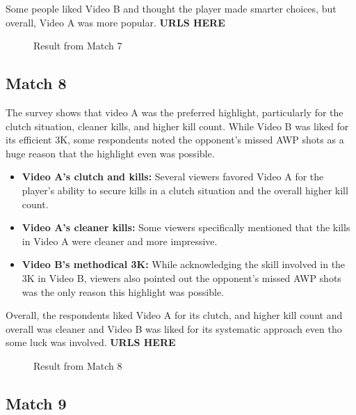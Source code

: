 Some people liked Video B and thought the player made smarter choices, but overall, Video A was more popular.
\textbf{URLS HERE}
\begin{figure}
\centering
{}
\caption{Result from Match 7}
\label{fig:match7}
\end{figure}
\subsection{Match 8}
The survey shows that video A was the preferred highlight, particularly for the clutch situation, cleaner kills, and higher kill count. While Video B was liked for its efficient 3K, some respondents noted the opponent's missed AWP shots as a huge reason that the highlight even was possible.

\begin{itemize}
\item \textbf{Video A's clutch and kills:} Several viewers favored Video A for the player's ability to secure kills in a clutch situation and the overall higher kill count.
\item \textbf{Video A's cleaner kills:} Some viewers specifically mentioned that the kills in Video A were cleaner and more impressive.
\item \textbf{Video B's methodical 3K:} While acknowledging the skill involved in the 3K in Video B, viewers also pointed out the opponent's missed AWP shots was the only reason this highlight was possible.
\end{itemize}

Overall, the respondents liked Video A for its clutch, and higher kill count and overall was cleaner and Video B was liked for its systematic approach even tho some luck was involved.
\textbf{URLS HERE}
\begin{figure}
\centering
{}
\caption{Result from Match 8}
\label{fig:match8}
\end{figure}
\subsection{Match 9}

